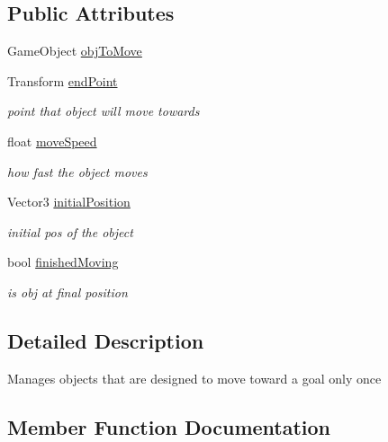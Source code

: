 \subsection*{Public Attributes}
\begin{DoxyCompactItemize}
\item 
Game\+Object \hyperlink{class_one_way_moving_object_a738199df4fd9102323b3031b91f27cee}{obj\+To\+Move}
\item 
Transform \hyperlink{class_one_way_moving_object_ada34abca5c152d343ca7ce4f8d526386}{end\+Point}
\begin{DoxyCompactList}\small\item\em point that object will move towards \end{DoxyCompactList}\item 
float \hyperlink{class_one_way_moving_object_a57d03a6a88136b9c0a2fb931d3753fbd}{move\+Speed}
\begin{DoxyCompactList}\small\item\em how fast the object moves \end{DoxyCompactList}\item 
Vector3 \hyperlink{class_one_way_moving_object_a3373e130216d4a6ef9f6ba38083aee8b}{initial\+Position}
\begin{DoxyCompactList}\small\item\em initial pos of the object \end{DoxyCompactList}\item 
bool \hyperlink{class_one_way_moving_object_aa188d5bd0f6dd799966acebc9088471f}{finished\+Moving}
\begin{DoxyCompactList}\small\item\em is obj at final position \end{DoxyCompactList}\end{DoxyCompactItemize}


\subsection{Detailed Description}
Manages objects that are designed to move toward a goal only once 

\subsection{Member Function Documentation}
\mbox{\label{class_one_way_moving_object_a09d08513eaa584681898a1c13d33de1c}} 
